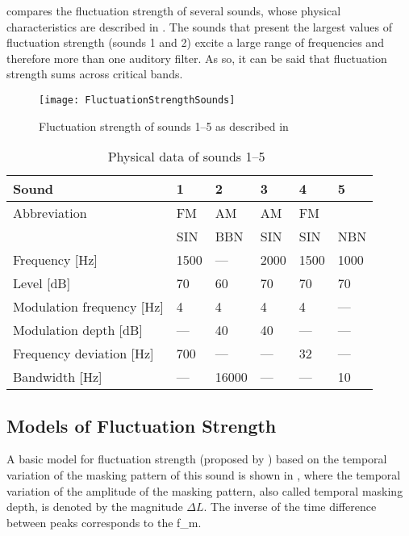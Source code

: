 \documentclass[../main.tex]{subfiles}
\begin{document}
\begin{theoreticalbackground}
 compares the fluctuation strength of several sounds,
whose physical characteristics are described in . The
sounds that present the largest values of fluctuation strength (sounds 1 and 2)
excite a large range of frequencies and therefore more than one auditory filter.
As so, it can be said that fluctuation strength sums across critical bands.

\begin{figure}[!ht]
  \centering
  \texttt{[image: FluctuationStrengthSounds]}
  \caption{Fluctuation strength of sounds 1--5 as described in
    ~\cite[pp. 252]{Fastl2007Psychoacoustics}}
\label{fig:flucstrensnds}
\end{figure}

\begin{table}[!ht]
  \centering
  \begin{tabu} to \linewidth{ lXXXXX }
    \toprule
    Sound & 1 & 2 & 3 & 4 & 5 \\
    \midrule
    Abbreviation & FM & AM & AM & FM & \\
    & SIN & BBN & SIN & SIN & NBN \\
    Frequency [Hz] & 1500 & --- & 2000 & 1500 & 1000 \\
    Level [dB] & 70 & 60 & 70 & 70 & 70 \\
    Modulation frequency [Hz] & 4 & 4 & 4 & 4 & --- \\
    Modulation depth [dB] & --- & 40 & 40 & --- & --- \\
    Frequency deviation [Hz] & 700 & --- & --- & 32 & --- \\
    Bandwidth [Hz] & --- & 16000 & --- & --- & 10 \\
    \bottomrule
  \end{tabu}
  \caption{Physical data of sounds
    1--5~\cite[pp. 253]{Fastl2007Psychoacoustics}}
\label{tab:flucstrensnds}
\end{table}

\subsection{Models of Fluctuation Strength}

A basic model for fluctuation strength (proposed by
\textcite[pp.~254]{Fastl2007Psychoacoustics}) based on the temporal variation of
the masking pattern of this sound is shown in , where
the temporal variation of the amplitude of the masking pattern, also called
temporal masking depth, is denoted by the magnitude $\Delta L$. The inverse of
the time difference between peaks corresponds to the \gls{f_m}.


\end{theoreticalbackground}
\end{document}
